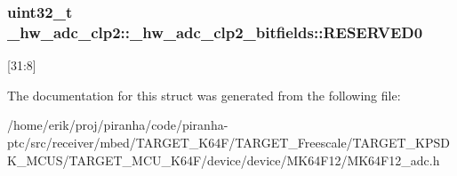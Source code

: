 \subsubsection[{\texorpdfstring{R\+E\+S\+E\+R\+V\+E\+D0}{RESERVED0}}]{\setlength{\rightskip}{0pt plus 5cm}uint32\+\_\+t \+\_\+hw\+\_\+adc\+\_\+clp2\+::\+\_\+hw\+\_\+adc\+\_\+clp2\+\_\+bitfields\+::\+R\+E\+S\+E\+R\+V\+E\+D0}\hypertarget{struct__hw__adc__clp2_1_1__hw__adc__clp2__bitfields_a189d30a549e4153d2792fa479c02a6ec}{}\label{struct__hw__adc__clp2_1_1__hw__adc__clp2__bitfields_a189d30a549e4153d2792fa479c02a6ec}
\mbox{[}31\+:8\mbox{]} 

The documentation for this struct was generated from the following file\+:\begin{DoxyCompactItemize}
\item 
/home/erik/proj/piranha/code/piranha-\/ptc/src/receiver/mbed/\+T\+A\+R\+G\+E\+T\+\_\+\+K64\+F/\+T\+A\+R\+G\+E\+T\+\_\+\+Freescale/\+T\+A\+R\+G\+E\+T\+\_\+\+K\+P\+S\+D\+K\+\_\+\+M\+C\+U\+S/\+T\+A\+R\+G\+E\+T\+\_\+\+M\+C\+U\+\_\+\+K64\+F/device/device/\+M\+K64\+F12/M\+K64\+F12\+\_\+adc.\+h\end{DoxyCompactItemize}
